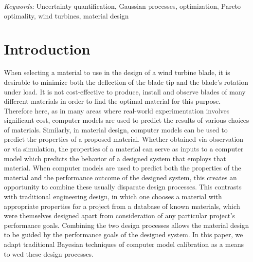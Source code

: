 \documentclass[12pt]{article}
\begin{document}
\noindent%
{\it Keywords:}  Uncertainty quantification, Gaussian processes, optimization, Pareto optimality, wind turbines, material design
\vfill

\newpage
{} %
\section{Introduction}
\label{introduction}

When selecting a material to use in the design of a wind turbine blade, it is desirable to minimize both the deflection of the blade tip and the blade's rotation under load.
%
It is not cost-effective to produce, install and observe blades of many different materials in order to find the optimal material for this purpose.
%
Therefore here, as in many areas where real-world experimentation involves significant cost, computer models are used to predict the results of various choices of materials.
%
Similarly, in material design, computer models can be used to predict the properties of a proposed material.
%
Whether obtained via observation or via simulation, the properties of a material can serve as inputs to a computer model which predicts the behavior of a designed system that employs that material.
%
When computer models are used to predict both the properties of the material and the performance outcome of the designed system, this creates an opportunity to combine these usually disparate design processes.
%
This contrasts with traditional engineering design, in which one chooses a material with appropriate properties for a project from a database of known materials, which were themselves designed apart from consideration of any particular project's performance goals.
%
Combining the two design processes allows the material design to be guided by the performance goals of the designed system.
%
In this paper, we adapt traditional Bayesian techniques of computer model calibration as a means to wed these design processes.
%
\end{document}
